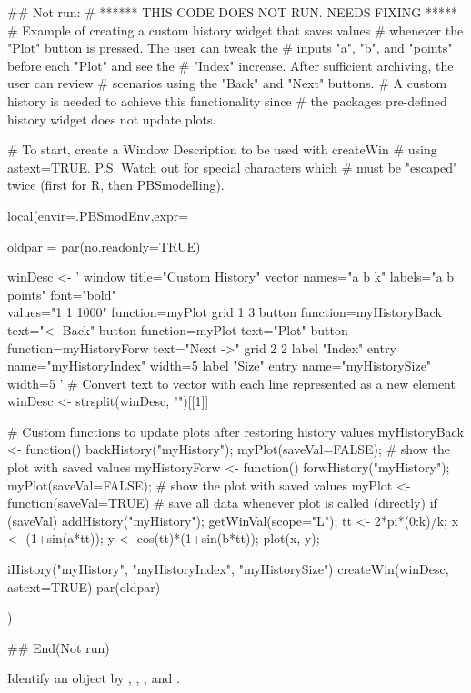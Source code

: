 \documentclass[letterpaper]{book}
\begin{document}
\begin{Examples}
\begin{ExampleCode}
## Not run: 
# ****** THIS CODE DOES NOT RUN. NEEDS FIXING *****
# Example of creating a custom history widget that saves values 
# whenever the "Plot" button is pressed. The user can tweak the 
# inputs "a", "b", and "points" before each "Plot" and see the 
# "Index" increase. After sufficient archiving, the user can review 
# scenarios using the "Back" and "Next" buttons. 
# A custom history is needed to achieve this functionality since 
# the packages pre-defined history widget does not update plots.

# To start, create a Window Description to be used with createWin 
# using astext=TRUE. P.S. Watch out for special characters which 
# must be "escaped" twice (first for R, then PBSmodelling).

local(envir=.PBSmodEnv,expr={
  oldpar = par(no.readonly=TRUE)

winDesc <- '
  window title="Custom History"
  vector names="a b k" labels="a b points" font="bold" \\
  values="1 1 1000" function=myPlot
  grid 1 3
    button function=myHistoryBack text="<- Back"
    button function=myPlot text="Plot"
    button function=myHistoryForw text="Next ->"
  grid 2 2
    label "Index"
    entry name="myHistoryIndex" width=5
    label "Size"
    entry name="myHistorySize" width=5
'
# Convert text to vector with each line represented as a new element
winDesc <- strsplit(winDesc, "\n")[[1]]

# Custom functions to update plots after restoring history values
myHistoryBack <- function() {
  backHistory("myHistory");
  myPlot(saveVal=FALSE); # show the plot with saved values
}
myHistoryForw <- function() {
  forwHistory("myHistory");
  myPlot(saveVal=FALSE); # show the plot with saved values 
}
myPlot <- function(saveVal=TRUE) {
  # save all data whenever plot is called (directly)
  if (saveVal) addHistory("myHistory");
  getWinVal(scope="L");
  tt <- 2*pi*(0:k)/k;
  x <- (1+sin(a*tt));  y <- cos(tt)*(1+sin(b*tt));
  plot(x, y);
}

  iHistory("myHistory", "myHistoryIndex", "myHistorySize")
  createWin(winDesc, astext=TRUE)
  par(oldpar)
})

## End(Not run)
\end{ExampleCode}
\end{Examples}
%
\begin{Description}\relax
Identify an object by , , ,
and .
\end{Description}
\end{document}
